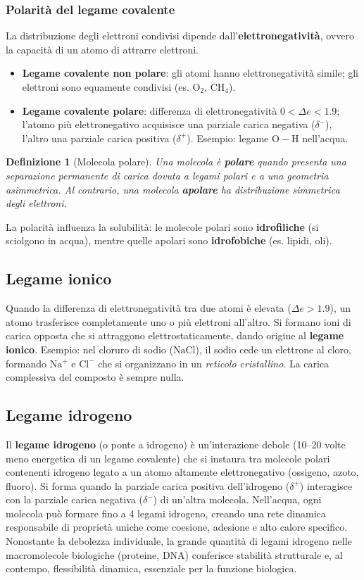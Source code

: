 \documentclass[12pt,a4paper]{report}
\newtheorem{definizione}{Definizione}[section]
\begin{document}
\subsubsection{Polarità del legame covalente}
La distribuzione degli elettroni condivisi dipende dall'\textbf{elettronegatività}, ovvero la capacità di un atomo di attrarre elettroni.
\begin{itemize}
\item \textbf{Legame covalente non polare}: gli atomi hanno elettronegatività simile; gli elettroni sono equamente condivisi (es. \(\mathrm{O_2}\), \(\mathrm{CH_4}\)).
\item \textbf{Legame covalente polare}: differenza di elettronegatività \(0 < \Delta e < 1.9\); l'atomo più elettronegativo acquisisce una parziale carica negativa (\(\delta^-\)), l'altro una parziale carica positiva (\(\delta^+\)). Esempio: legame \(\mathrm{O-H}\) nell'acqua.
\end{itemize}
\begin{definizione}[Molecola polare]
Una molecola è \textbf{polare} quando presenta una separazione permanente di carica dovuta a legami polari e a una geometria asimmetrica. Al contrario, una molecola \textbf{apolare} ha distribuzione simmetrica degli elettroni.
\end{definizione}
La polarità influenza la solubilità: le molecole polari sono \textbf{idrofiliche} (si sciolgono in acqua), mentre quelle apolari sono \textbf{idrofobiche} (es. lipidi, oli).
\subsection{Legame ionico}
Quando la differenza di elettronegatività tra due atomi è elevata (\(\Delta e > 1.9\)), un atomo trasferisce completamente uno o più elettroni all'altro. Si formano ioni di carica opposta che si attraggono elettrostaticamente, dando origine al \textbf{legame ionico}.
Esempio: nel cloruro di sodio (\(\mathrm{NaCl}\)), il sodio cede un elettrone al cloro, formando \(\mathrm{Na^+}\) e \(\mathrm{Cl^-}\) che si organizzano in un \textit{reticolo cristallino}. La carica complessiva del composto è sempre nulla.
\subsection{Legame idrogeno}
Il \textbf{legame idrogeno} (o ponte a idrogeno) è un'interazione debole (10--20 volte meno energetica di un legame covalente) che si instaura tra molecole polari contenenti idrogeno legato a un atomo altamente elettronegativo (ossigeno, azoto, fluoro).
Si forma quando la parziale carica positiva dell'idrogeno (\(\delta^+\)) interagisce con la parziale carica negativa (\(\delta^-\)) di un'altra molecola. Nell'acqua, ogni molecola può formare fino a 4 legami idrogeno, creando una rete dinamica responsabile di proprietà uniche come coesione, adesione e alto calore specifico.
Nonostante la debolezza individuale, la grande quantità di legami idrogeno nelle macromolecole biologiche (proteine, DNA) conferisce stabilità strutturale e, al contempo, flessibilità dinamica, essenziale per la funzione biologica.
\end{document}

